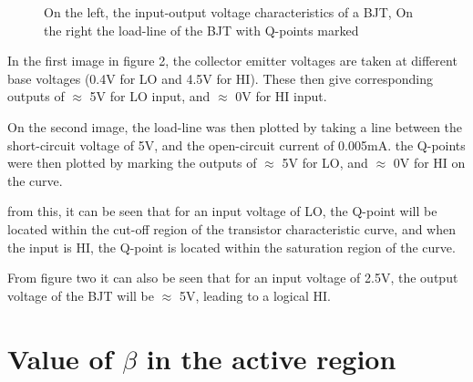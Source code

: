 \documentclass[a4paper,11pt]{article}
\begin{document}
\begin{figure}[h]
 \begin{center}
  \caption{On the  left, the input-output voltage characteristics of a BJT, On the right the load-line of the BJT with Q-points marked}
 \end{center}
\end{figure}

In the first image in figure 2, the collector emitter voltages are taken at different base voltages (0.4V for LO and 4.5V for HI). These then give corresponding outputs of $\approx$ 5V for LO input, and $\approx$ 0V for HI input.

On the second image, the load-line was then plotted by taking a line between the short-circuit voltage of 5V, and the open-circuit current of 0.005mA. the Q-points were then plotted by marking the outputs of $\approx$ 5V for LO, and $\approx$ 0V for HI on the curve.

from this, it can be seen that for an input voltage of LO, the Q-point will be located within the cut-off region of the transistor characteristic curve, and when the input is HI, the Q-point is located within the saturation region of the curve. 

From figure two it can also be seen that for an input voltage of 2.5V, the output voltage of the BJT will be $\approx$ 5V, leading to a logical HI.

\section{Value of $\beta$ in the active region}
\end{document}
